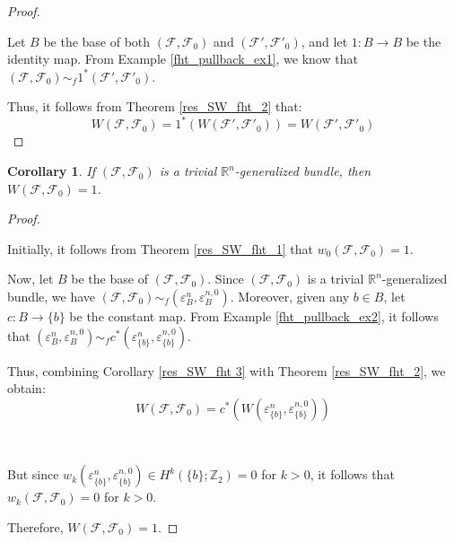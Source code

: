 \documentclass[12pt,oneside]{book}
\newtheorem{cor}    {Corollary}[chapter]
\newcommand{\R}{\mathbb{R}}
\newcommand{\Z}{\mathbb{Z}}
\begin{document}
    \begin{proof}

        \

    	Let $B$ be the base of both $(\mathcal{F},\mathcal{F}_{0})$ and $(\mathcal{F'},\mathcal{F'}_{0})$, and let $1:B\to B$ be the 
        identity map. From Example \ref{fht_pullback_ex1}, we know that 
        $(\mathcal{F},\mathcal{F}_{0})\sim_{f} 1^{*}(\mathcal{F'},\mathcal{F'}_{0})$.

    	Thus, it follows from Theorem \ref{res_SW_fht_2} that:
    	$$ W(\mathcal{F},\mathcal{F}_{0})=1^{*}(W(\mathcal{F'},\mathcal{F'}_{0}))=W(\mathcal{F'},\mathcal{F'}_{0}) $$

    \end{proof}

    \begin{cor}\label{res_SW_fht_4}
    	If $(\mathcal{F},\mathcal{F}_{0})$ is a trivial $\R^{n}$-generalized bundle, then 
        $W(\mathcal{F},\mathcal{F}_{0})=1$.
    \end{cor}

    \begin{proof}

        \

    	Initially, it follows from Theorem \ref{res_SW_fht_1} that $w_{0}(\mathcal{F},\mathcal{F}_{0})=1$.

    	Now, let $B$ be the base of $(\mathcal{F},\mathcal{F}_{0})$. Since $(\mathcal{F},\mathcal{F}_{0})$ is a trivial 
        $\R^{n}$-generalized bundle, we have $(\mathcal{F},\mathcal{F}_{0})\sim_{f} (\varepsilon^{n}_{B},\varepsilon^{n,0}_{B})$. Moreover, 
        given any $b\in B$, let $c:B\to \{ b \}$ be the constant map. From Example \ref{fht_pullback_ex2}, it follows that 
        $(\varepsilon^{n}_{B},\varepsilon^{n,0}_{B})\sim_{f} c^{*}(\varepsilon^{n}_{\{ b \}},\varepsilon^{n,0}_{\{ b \}})$.

    	Thus, combining Corollary \ref{res_SW_fht 3} with Theorem \ref{res_SW_fht_2}, we obtain:
    	$$ W(\mathcal{F},\mathcal{F}_{0})=c^{*}(W(\varepsilon^{n}_{\{ b \}},\varepsilon^{n,0}_{\{ b \}})) $$

        \

    	But since $w_{k}(\varepsilon^{n}_{\{ b \}},\varepsilon^{n,0}_{\{ b \}})\in H^{k}(\{ b \};\Z_{2})=0$ for $k>0$, it follows that 
        $w_{k}(\mathcal{F},\mathcal{F}_{0})=0$ for $k>0$.

    	Therefore, $W(\mathcal{F},\mathcal{F}_{0})=1$.

    \end{proof}
\end{document}

